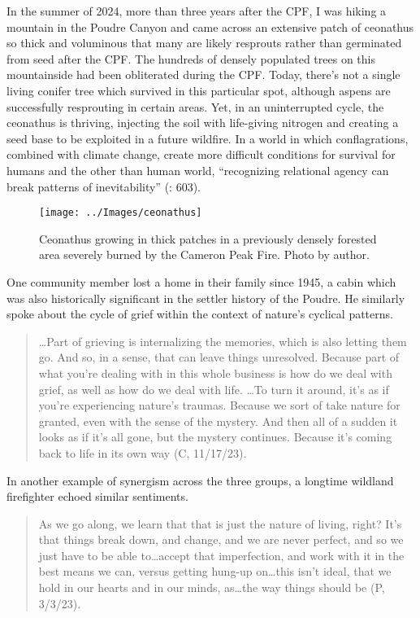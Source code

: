 \documentclass[
]{article}
\begin{document}
In the summer of 2024, more than three years after the CPF, I was hiking a mountain in the Poudre Canyon and came across an extensive patch of ceonathus so thick and voluminous that many are likely resprouts rather than germinated from seed after the CPF. The hundreds of densely populated trees on this mountainside had been obliterated during the CPF. Today, there's not a single living conifer tree which survived in this particular spot, although aspens are successfully resprouting in certain areas. Yet, in an uninterrupted cycle, the ceonathus is thriving, injecting the soil with life-giving nitrogen and creating a seed base to be exploited in a future wildfire. In a world in which conflagrations, combined with climate change, create more difficult conditions for survival for humans and the other than human world, ``recognizing relational agency can break patterns of inevitability'' (: 603).

\begin{figure}
\texttt{[image: ../Images/ceonathus]} \caption[Ceonathus]{Ceonathus growing in thick patches in a previously densely forested area severely burned by the Cameron Peak Fire. Photo by author.}\label{fig:figureTitle16}
\end{figure}

One community member lost a home in their family since 1945, a cabin which was also historically significant in the settler history of the Poudre. He similarly spoke about the cycle of grief within the context of nature's cyclical patterns.

\begin{quote}
\ldots Part of grieving is internalizing the memories, which is also letting them go. And so, in a sense, that can leave things unresolved. Because part of what you're dealing with in this whole business is how do we deal with grief, as well as how do we deal with life. \ldots To turn it around, it's as if you're experiencing nature's traumas. Because we sort of take nature for granted, even with the sense of the mystery. And then all of a sudden it looks as if it's all gone, but the mystery continues. Because it's coming back to life in its own way (C, 11/17/23).
\end{quote}

In another example of synergism across the three groups, a longtime wildland firefighter echoed similar sentiments.

\begin{quote}
As we go along, we learn that that is just the nature of living, right? It's that things break down, and change, and we are never perfect, and so we just have to be able to\ldots accept that imperfection, and work with it in the best means we can, versus getting hung-up on\ldots this isn't ideal, that we hold in our hearts and in our minds, as\ldots the way things should be (P, 3/3/23).
\end{quote}
\end{document}
